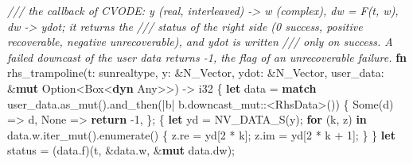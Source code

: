 \documentclass[
  10pt,
]{article}
\newenvironment{Shaded}{}{}
\newcommand{\BuiltInTok}[1]{\textcolor[rgb]{0.00,0.50,0.00}{#1}}
\newcommand{\CommentTok}[1]{\textcolor[rgb]{0.38,0.63,0.69}{\textit{#1}}}
\newcommand{\ConstantTok}[1]{\textcolor[rgb]{0.53,0.00,0.00}{#1}}
\newcommand{\ControlFlowTok}[1]{\textcolor[rgb]{0.00,0.44,0.13}{\textbf{#1}}}
\newcommand{\DataTypeTok}[1]{\textcolor[rgb]{0.56,0.13,0.00}{#1}}
\newcommand{\DecValTok}[1]{\textcolor[rgb]{0.25,0.63,0.44}{#1}}
\newcommand{\KeywordTok}[1]{\textcolor[rgb]{0.00,0.44,0.13}{\textbf{#1}}}
\newcommand{\NormalTok}[1]{#1}
\newcommand{\OperatorTok}[1]{\textcolor[rgb]{0.40,0.40,0.40}{#1}}
\newcommand{\PreprocessorTok}[1]{\textcolor[rgb]{0.74,0.48,0.00}{#1}}
\begin{document}
\begin{Shaded}
\begin{Highlighting}[]
\CommentTok{/// the callback of CVODE: y (real, interleaved) {-}\textgreater{} w (complex), dw = F(t, w), dw {-}\textgreater{} ydot; it returns the}
\CommentTok{/// status of the right side (0 success, positive recoverable, negative unrecoverable), and ydot is written}
\CommentTok{/// only on success.  A failed downcast of the user data returns {-}1, the flag of an unrecoverable failure.}
\KeywordTok{fn}\NormalTok{ rhs\_trampoline(t}\OperatorTok{:}\NormalTok{ sunrealtype}\OperatorTok{,}\NormalTok{ y}\OperatorTok{:} \OperatorTok{\&}\NormalTok{N\_Vector}\OperatorTok{,}\NormalTok{ ydot}\OperatorTok{:} \OperatorTok{\&}\NormalTok{N\_Vector}\OperatorTok{,}\NormalTok{ user\_data}\OperatorTok{:} \OperatorTok{\&}\KeywordTok{mut} \DataTypeTok{Option}\OperatorTok{\textless{}}\DataTypeTok{Box}\OperatorTok{\textless{}}\KeywordTok{dyn} \BuiltInTok{Any}\OperatorTok{\textgreater{}\textgreater{}}\NormalTok{) }\OperatorTok{{-}\textgreater{}} \DataTypeTok{i32} \OperatorTok{\{}
    \KeywordTok{let}\NormalTok{ data }\OperatorTok{=} \ControlFlowTok{match}\NormalTok{ user\_data}\OperatorTok{.}\NormalTok{as\_mut()}\OperatorTok{.}\NormalTok{and\_then(}\OperatorTok{|}\NormalTok{b}\OperatorTok{|}\NormalTok{ b}\OperatorTok{.}\PreprocessorTok{downcast\_mut::}\OperatorTok{\textless{}}\NormalTok{RhsData}\OperatorTok{\textgreater{}}\NormalTok{()) }\OperatorTok{\{}
        \ConstantTok{Some}\NormalTok{(d) }\OperatorTok{=\textgreater{}}\NormalTok{ d}\OperatorTok{,}
        \ConstantTok{None} \OperatorTok{=\textgreater{}} \ControlFlowTok{return} \OperatorTok{{-}}\DecValTok{1}\OperatorTok{,}
    \OperatorTok{\};}
    \OperatorTok{\{}
        \KeywordTok{let}\NormalTok{ yd }\OperatorTok{=}\NormalTok{ NV\_DATA\_S(y)}\OperatorTok{;}
        \ControlFlowTok{for}\NormalTok{ (k}\OperatorTok{,}\NormalTok{ z) }\KeywordTok{in}\NormalTok{ data}\OperatorTok{.}\NormalTok{w}\OperatorTok{.}\NormalTok{iter\_mut()}\OperatorTok{.}\NormalTok{enumerate() }\OperatorTok{\{}
\NormalTok{            z}\OperatorTok{.}\NormalTok{re }\OperatorTok{=}\NormalTok{ yd[}\DecValTok{2} \OperatorTok{*}\NormalTok{ k]}\OperatorTok{;}
\NormalTok{            z}\OperatorTok{.}\NormalTok{im }\OperatorTok{=}\NormalTok{ yd[}\DecValTok{2} \OperatorTok{*}\NormalTok{ k }\OperatorTok{+} \DecValTok{1}\NormalTok{]}\OperatorTok{;}
        \OperatorTok{\}}
    \OperatorTok{\}}
    \KeywordTok{let}\NormalTok{ status }\OperatorTok{=}\NormalTok{ (data}\OperatorTok{.}\NormalTok{f)(t}\OperatorTok{,} \OperatorTok{\&}\NormalTok{data}\OperatorTok{.}\NormalTok{w}\OperatorTok{,} \OperatorTok{\&}\KeywordTok{mut}\NormalTok{ data}\OperatorTok{.}\NormalTok{dw)}\OperatorTok{;}

\end{Highlighting}
\end{Shaded}
\end{document}
